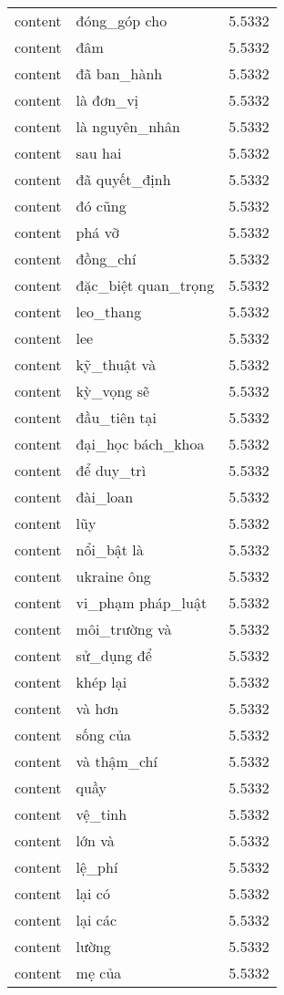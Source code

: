 \documentclass{article}
\begin{document}
\begin{tabular}{lll}
content & đóng\_góp cho & 5.5332\\
content & đâm & 5.5332\\
content & đã ban\_hành & 5.5332\\
content & là đơn\_vị & 5.5332\\
content & là nguyên\_nhân & 5.5332\\
content & sau hai & 5.5332\\
content & đã quyết\_định & 5.5332\\
content & đó cũng & 5.5332\\
content & phá vỡ & 5.5332\\
content & đồng\_chí & 5.5332\\
content & đặc\_biệt quan\_trọng & 5.5332\\
content & leo\_thang & 5.5332\\
content & lee & 5.5332\\
content & kỹ\_thuật và & 5.5332\\
content & kỳ\_vọng sẽ & 5.5332\\
content & đầu\_tiên tại & 5.5332\\
content & đại\_học bách\_khoa & 5.5332\\
content & để duy\_trì & 5.5332\\
content & đài\_loan & 5.5332\\
content & lũy & 5.5332\\
content & nổi\_bật là & 5.5332\\
content & ukraine ông & 5.5332\\
content & vi\_phạm pháp\_luật & 5.5332\\
content & môi\_trường và & 5.5332\\
content & sử\_dụng để & 5.5332\\
content & khép lại & 5.5332\\
content & và hơn & 5.5332\\
content & sống của & 5.5332\\
content & và thậm\_chí & 5.5332\\
content & quầy & 5.5332\\
content & vệ\_tinh & 5.5332\\
content & lớn và & 5.5332\\
content & lệ\_phí & 5.5332\\
content & lại có & 5.5332\\
content & lại các & 5.5332\\
content & lường & 5.5332\\
content & mẹ của & 5.5332\\

\end{tabular}
\end{document}

